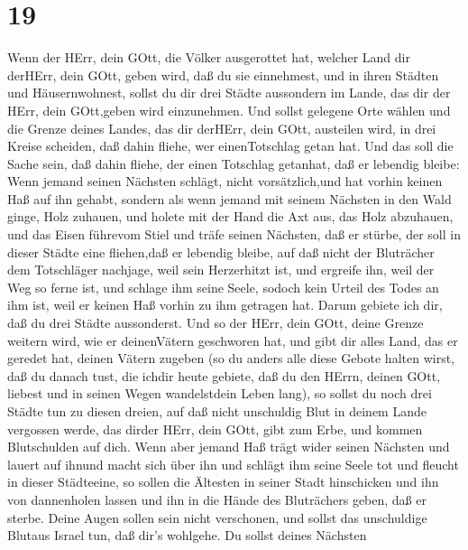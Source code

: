 \hypertarget{section-18}{%
\section{19}\label{section-18}}

 Wenn der HErr, dein GOtt, die Völker ausgerottet hat,
welcher Land dir derHErr, dein GOtt, geben wird, daß du sie einnehmest,
und in ihren Städten und Häusernwohnest,  sollst du dir drei
Städte aussondern im Lande, das dir der HErr, dein GOtt,geben wird
einzunehmen.  Und sollst gelegene Orte wählen und die Grenze
deines Landes, das dir derHErr, dein GOtt, austeilen wird, in drei
Kreise scheiden, daß dahin fliehe, wer einenTotschlag getan hat.
 Und das soll die Sache sein, daß dahin fliehe, der einen
Totschlag getanhat, daß er lebendig bleibe: Wenn jemand seinen Nächsten
schlägt, nicht vorsätzlich,und hat vorhin keinen Haß auf ihn gehabt,
 sondern als wenn jemand mit seinem Nächsten in den Wald
ginge, Holz zuhauen, und holete mit der Hand die Axt aus, das Holz
abzuhauen, und das Eisen führevom Stiel und träfe seinen Nächsten, daß
er stürbe, der soll in dieser Städte eine fliehen,daß er lebendig
bleibe,  auf daß nicht der Bluträcher dem Totschläger
nachjage, weil sein Herzerhitzt ist, und ergreife ihn, weil der Weg so
ferne ist, und schlage ihm seine Seele, sodoch kein Urteil des Todes an
ihm ist, weil er keinen Haß vorhin zu ihm getragen hat. 
Darum gebiete ich dir, daß du drei Städte aussonderst.  Und
so der HErr, dein GOtt, deine Grenze weitern wird, wie er deinenVätern
geschworen hat, und gibt dir alles Land, das er geredet hat, deinen
Vätern zugeben  (so du anders alle diese Gebote halten
wirst, daß du danach tust, die ichdir heute gebiete, daß du den HErrn,
deinen GOtt, liebest und in seinen Wegen wandelstdein Leben lang), so
sollst du noch drei Städte tun zu diesen dreien,  auf daß
nicht unschuldig Blut in deinem Lande vergossen werde, das dirder HErr,
dein GOtt, gibt zum Erbe, und kommen Blutschulden auf dich.
 Wenn aber jemand Haß trägt wider seinen Nächsten und
lauert auf ihnund macht sich über ihn und schlägt ihm seine Seele tot
und fleucht in dieser Städteeine,  so sollen die Ältesten
in seiner Stadt hinschicken und ihn von dannenholen lassen und ihn in
die Hände des Bluträchers geben, daß er sterbe.  Deine
Augen sollen sein nicht verschonen, und sollst das unschuldige Blutaus
Israel tun, daß dir's wohlgehe.  Du sollst deines Nächsten
